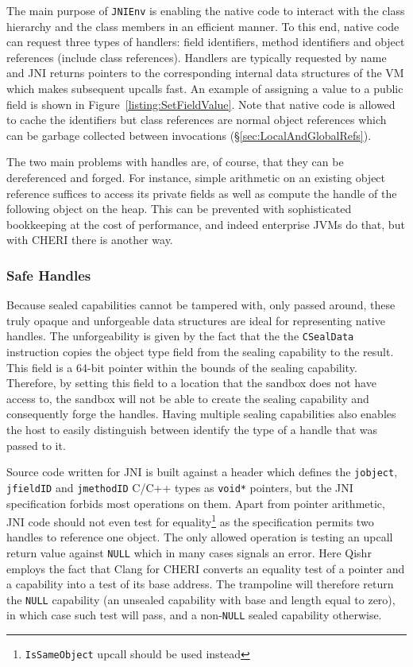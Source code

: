 \documentclass[a4paper,12pt,twoside,openright]{report}
\newcommand{\insn}[1]{\texttt{#1}}
\newcommand{\keyword}[1]{\textsf{#1}}
\begin{document}
The main purpose of \texttt{JNIEnv} is enabling the native code to interact with the class hierarchy and the class members in an efficient manner. To this end, native code can request three types of handlers: field identifiers, method identifiers and object references (include class references). Handlers are typically requested by name and JNI returns pointers to the corresponding internal data structures of the VM which makes subsequent upcalls fast. An example of assigning a value to a \keyword{public} field is shown in Figure~\ref{listing:SetFieldValue}. Note that native code is allowed to cache the identifiers but class references are normal object references which can be garbage collected between invocations (\S\ref{sec:LocalAndGlobalRefs}). 

The two main problems with handles are, of course, that they can be dereferenced and forged. For instance, simple arithmetic on an existing object reference suffices to access its private fields as well as compute the handle of the following object on the heap. This can be prevented with sophisticated bookkeeping at the cost of performance, and indeed enterprise JVMs do that, but with CHERI there is another way. 

\subsubsection{Safe Handles}

Because sealed capabilities cannot be tampered with, only passed around, these truly opaque and unforgeable data structures are ideal for representing native handles. The unforgeability is given by the fact that the the \insn{CSealData} instruction copies the object type field from the sealing capability to the result. This field is a 64-bit pointer within the bounds of the sealing capability. Therefore, by setting this field to a location that the sandbox does not have access to, the sandbox will not be able to create the sealing capability and consequently forge the handles. Having multiple sealing capabilities also enables the host to easily distinguish between identify the type of a handle that was passed to it.

Source code written for JNI is built against a header which defines the \texttt{jobject}, \texttt{jfieldID} and \texttt{jmethodID} C/C++ types as \texttt{void*} pointers, but the JNI specification forbids most operations on them. Apart from pointer arithmetic, JNI code should not even test for equality\footnote{\texttt{IsSameObject} upcall should be used instead} as the specification permits two handles to reference one object. The only allowed operation is testing an upcall return value against \texttt{NULL} which in many cases signals an error. Here Qishr employs the fact that Clang for CHERI converts an equality test of a pointer and a capability into a test of its base address. The trampoline will therefore return the \texttt{NULL} capability (an unsealed capability with base and length equal to zero), in which case such test will pass, and a non-\texttt{NULL} sealed capability otherwise. 
\end{document}
